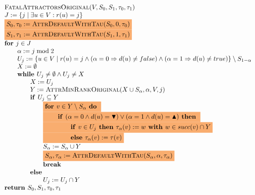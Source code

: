\documentclass{article}
\newcommand{\If}{\text{\textbf{if }}}
\newcommand{\Do}{\text{\textbf{ do }}}
\newcommand{\Then}{\text{\textbf{ then }}}
\newcommand{\Else}{\text{\textbf{else }}}
\newcommand{\For}{\text{\textbf{for }}}
\newcommand{\While}{\text{\textbf{while }}}
\newcommand{\Return}{\text{\textbf{return }}}
\begin{document}
\begin{equation*}
\begin{array}{l}
\textsc{FatalAttractorsOriginal}(V, S_0, S_1, \tau_0, \tau_1)\\
J := \{ j \mid \exists u \in V : r(u) = j \} \\
\colorbox{Apricot}{$S_0, \tau_0 := \textsc{AttrDefaultWithTau}(S_0, 0, \tau_0)$} \\
\colorbox{Apricot}{$S_1, \tau_1 := \textsc{AttrDefaultWithTau}(S_1, 1, \tau_1)$} \\
\textbf{for } j \in J \\
\qquad \alpha := j \bmod 2\\
\qquad U_j := \{u \in V \mid r(u) = j \wedge (\alpha = 0 \Rightarrow d(u) \neq false) 
\wedge (\alpha = 1 \Rightarrow d(u) \neq true) \} \setminus S_{1-\alpha} \\
\qquad X := \emptyset \\
\qquad \While U_j \neq \emptyset \wedge U_j \neq X \\ 
\qquad \qquad X := U_j\\
\qquad \qquad Y := \textsc{AttrMinRankOriginal}(X \cup S_\alpha, \alpha, V, j) \\
\qquad \qquad \If U_j \subseteq Y \\
\qquad \qquad \qquad \colorbox{Apricot}{$ \For v \in Y \setminus S_{\alpha} \Do $} \\
\qquad \qquad \qquad \colorbox{Apricot}{$ \qquad \If (\alpha = 0 \land d(u) = \blacktriangledown) \lor (\alpha = 1 \land d(u) = \blacktriangle) \Then $} \\
\qquad \qquad \qquad \colorbox{Apricot}{$ \qquad \qquad \If v \in U_j \Then \tau_{\alpha}(v) := w \textbf{ with } w \in succ(v) \cap Y $} \\
\qquad \qquad \qquad \colorbox{Apricot}{$ \qquad \qquad \Else \tau_{\alpha}(v) := \tau(v) $} \\
\qquad \qquad \qquad S_\alpha := S_\alpha \cup Y \\

\qquad\qquad\qquad \colorbox{Apricot}{$S_\alpha, \tau_\alpha := \textsc{AttrDefaultWithTau}(S_\alpha, \alpha, \tau_\alpha)$} \\
\qquad \qquad \qquad \textbf{break} \\
\qquad \qquad \textbf{else }\\
\qquad \qquad \qquad U_j := U_j \cap Y\\
\Return S_0, S_1, \tau_0,\tau_1
\end{array}
\end{equation*}
\end{document}
